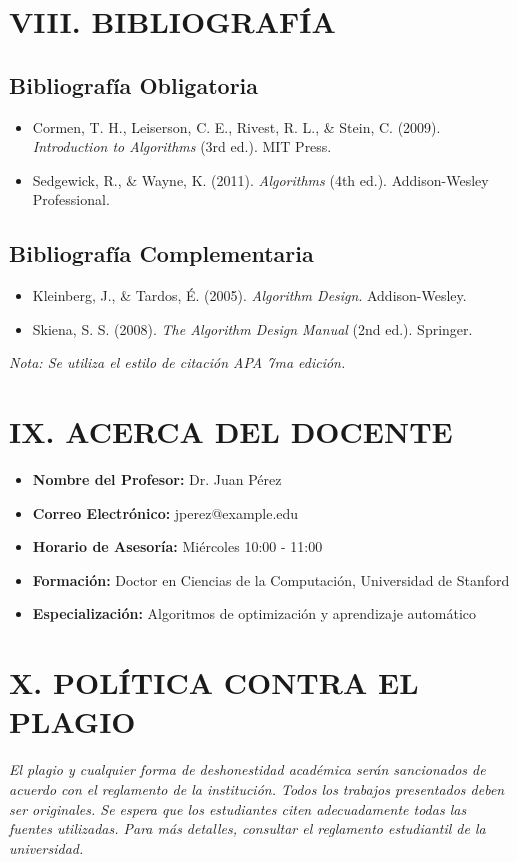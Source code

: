 \documentclass[12pt,a4paper]{article}
\begin{document}
\section*{VIII. BIBLIOGRAFÍA}
\subsection*{Bibliografía Obligatoria} %
\begin{itemize}[leftmargin=*]
    \item Cormen, T. H., Leiserson, C. E., Rivest, R. L., \& Stein, C. (2009). \textit{Introduction to Algorithms} (3rd ed.). MIT Press.
    \item Sedgewick, R., \& Wayne, K. (2011). \textit{Algorithms} (4th ed.). Addison-Wesley Professional.
\end{itemize}

\subsection*{Bibliografía Complementaria} %
\begin{itemize}[leftmargin=*]
    \item Kleinberg, J., \& Tardos, É. (2005). \textit{Algorithm Design}. Addison-Wesley.
    \item Skiena, S. S. (2008). \textit{The Algorithm Design Manual} (2nd ed.). Springer.
\end{itemize}
\textit{Nota: Se utiliza el estilo de citación APA 7ma edición.}
\vspace{0.5cm}

\section*{IX. ACERCA DEL DOCENTE} %
\begin{itemize}[leftmargin=*]
    \item \textbf{Nombre del Profesor:} Dr. Juan Pérez
    \item \textbf{Correo Electrónico:} jperez@example.edu
    \item \textbf{Horario de Asesoría:} Miércoles 10:00 - 11:00
    \item \textbf{Formación:} Doctor en Ciencias de la Computación, Universidad de Stanford
    \item \textbf{Especialización:} Algoritmos de optimización y aprendizaje automático
\end{itemize}
\vspace{0.5cm}

\section*{X. POLÍTICA CONTRA EL PLAGIO}
\textit{El plagio y cualquier forma de deshonestidad académica serán sancionados de acuerdo con el reglamento de la institución. Todos los trabajos presentados deben ser originales. Se espera que los estudiantes citen adecuadamente todas las fuentes utilizadas. Para más detalles, consultar el reglamento estudiantil de la universidad.}
\end{document}

